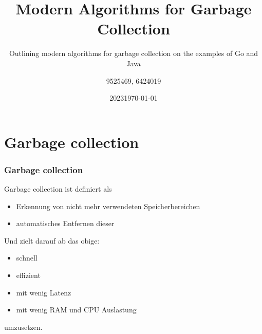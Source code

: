 \documentclass{beamer}
\title{Modern Algorithms for Garbage Collection}
\subtitle{Outlining modern algorithms for garbage collection on the examples of Go and Java}
\date[2023]{2023}
\author{9525469, 6424019}
\institute[DHBW Mosbach]{DHBW Mosbach}
\date{\today}
\begin{document}
    
    \frame{\titlepage}
    \begin{frame}
        \tableofcontents
    \end{frame}

	\section{Garbage collection}
        \begin{frame}
            \frametitle{Garbage collection}

            Garbage collection ist definiert als

            \begin{itemize}
                \item Erkennung von nicht mehr verwendeten Speicherbereichen
                \item automatisches Entfernen dieser
            \end{itemize}

            Und zielt darauf ab das obige:

            \begin{itemize}
                \item schnell
                \item effizient
                \item mit wenig Latenz
                \item mit wenig RAM und CPU Auslastung
            \end{itemize}

            umzusetzen.
        \end{frame}
\end{document}
